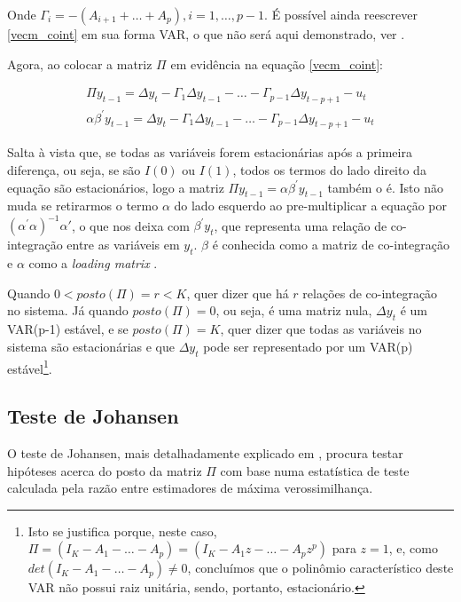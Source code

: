 \documentclass[a4paper,
               article,
               12pt,
               openany,
               oneside,
               english,
               brazil]{abntex2}
\numberwithin{equation}{section}
\begin{document}
   Onde $ \Gamma_i = -(A_{i+1} + \dots + A_p), i = 1, \dots, p-1 $. É possível ainda reescrever \eqref{vecm_coint} em sua forma VAR, o que não será aqui demonstrado, ver \cite[p.~248-249]{lutkepool}.

   Agora, ao colocar a matriz $ \Pi $ em evidência na equação \eqref{vecm_coint}:

   \begin{equation}
       \label{vecm_coint2}
       \begin{aligned}
       \Pi y_{t-1} = \Delta y_t - \Gamma_1 \Delta y_{t-1} - \dots - \Gamma_{p-1} \Delta y_{t-p+1} - u_t \\
           \alpha \beta^{'} y_{t-1} = \Delta y_t - \Gamma_1 \Delta y_{t-1} - \dots - \Gamma_{p-1} \Delta y_{t-p+1} - u_t
       \end{aligned}
   \end{equation}

   Salta à vista que, se todas as variáveis forem estacionárias após a primeira diferença, ou seja, se são $ I(0) $ ou $ I(1) $, todos os termos do lado direito da equação são estacionários, logo a matriz $ \Pi y_{t-1} = \alpha \beta^{'} y_{t-1} $ também o é. Isto não muda se retirarmos o termo $ \alpha $ do lado esquerdo ao pre-multiplicar a equação por $ (\alpha^{'}\alpha)^{-1}\alpha{'} $, o que nos deixa com $ \beta^{'}y_{t} $, que representa uma relação de co-integração entre as variáveis em $ y_t $. $ \beta $ é conhecida como a matriz de co-integração e $ \alpha $ como a \textit{loading matrix} \cite[p.~244-249]{lutkepool}.

   Quando $ 0 < posto(\Pi) = r < K $, quer dizer que há $ r $ relações de co-integração no sistema. Já quando $ posto(\Pi) = 0 $, ou seja, é uma matriz nula, $ \Delta y_t $ é um VAR(p-1) estável, e se $ posto(\Pi) = K $, quer dizer que todas as variáveis no sistema são estacionárias e que $ \Delta y_t $ pode ser representado por um VAR(p) estável\footnote{Isto se justifica porque, neste caso, $ \Pi = (I_K - A_1 - \dots - A_p) = (I_K - A_1z - \dots - A_pz^p) $ para $ z = 1 $, e, como $ det(I_K - A_1 - \dots - A_p) \neq 0 $, concluímos que o polinômio característico deste VAR não possui raiz unitária, sendo, portanto, estacionário.}.

   \subsection{Teste de Johansen}

   O teste de Johansen, mais detalhadamente explicado em \textcite[p.~327-330]{lutkepool}, procura testar hipóteses acerca do posto da matriz $ \Pi $ com base numa estatística de teste calculada pela razão entre estimadores de máxima verossimilhança.
\end{document}
